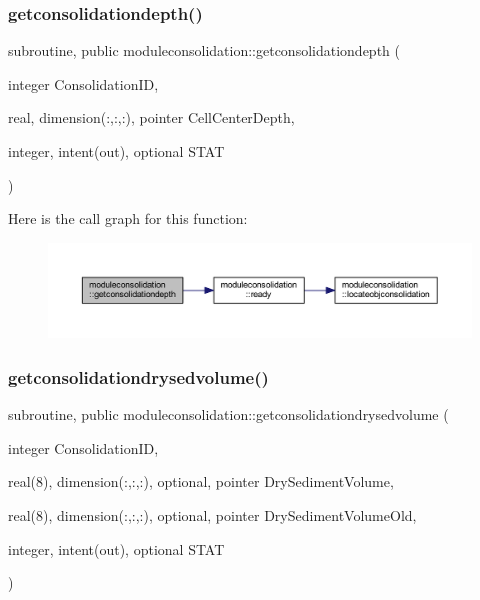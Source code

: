 \subsubsection{\texorpdfstring{getconsolidationdepth()}{getconsolidationdepth()}}
{\footnotesize\ttfamily subroutine, public moduleconsolidation\+::getconsolidationdepth (\begin{DoxyParamCaption}\item[{integer}]{Consolidation\+ID,  }\item[{real, dimension(\+:,\+:,\+:), pointer}]{Cell\+Center\+Depth,  }\item[{integer, intent(out), optional}]{S\+T\+AT }\end{DoxyParamCaption})}

Here is the call graph for this function\+:\nopagebreak
\begin{figure}[H]
\begin{center}
\leavevmode
\includegraphics[width=350pt]{namespacemoduleconsolidation_a7d4c44834bf2eef5548235e522170c91_cgraph}
\end{center}
\end{figure}
\mbox{\label{namespacemoduleconsolidation_a34d40947baf053926b3fe4e02b7c1225}} 
\subsubsection{\texorpdfstring{getconsolidationdrysedvolume()}{getconsolidationdrysedvolume()}}
{\footnotesize\ttfamily subroutine, public moduleconsolidation\+::getconsolidationdrysedvolume (\begin{DoxyParamCaption}\item[{integer}]{Consolidation\+ID,  }\item[{real(8), dimension(\+:,\+:,\+:), optional, pointer}]{Dry\+Sediment\+Volume,  }\item[{real(8), dimension(\+:,\+:,\+:), optional, pointer}]{Dry\+Sediment\+Volume\+Old,  }\item[{integer, intent(out), optional}]{S\+T\+AT }\end{DoxyParamCaption})}

